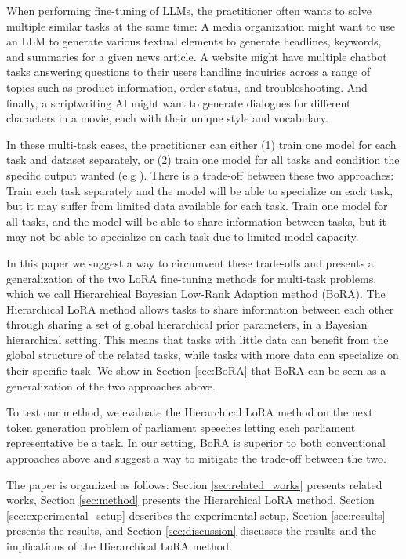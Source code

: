 \documentclass[fullpaper]{nldl}
\begin{document}
When performing fine-tuning of LLMs, the practitioner often wants to solve multiple similar tasks at the same time: 
A media organization might want to use an LLM to generate various textual elements to generate headlines, keywords, and summaries for a given news article. 
A website might have multiple chatbot tasks answering questions to their users handling inquiries across a range of topics such as product information, order status, and troubleshooting.
And finally, a scriptwriting AI might want to generate dialogues for different characters in a movie, each with their unique style and vocabulary.

In these multi-task cases, the practitioner can either (1) train one model for each task and dataset separately, or (2) train one model for all tasks and condition the specific output wanted (e.g \cite{Raffel2019}).
There is a trade-off between these two approaches: Train each task separately and the model will be able to specialize on each task, but it may suffer from limited data available for each task. Train one model for all tasks, and the model will be able to share information between tasks, but it may not be able to specialize on each task due to limited model capacity.

In this paper we suggest a way to circumvent these trade-offs and presents a generalization of the two LoRA fine-tuning methods for multi-task problems, which we call Hierarchical Bayesian Low-Rank Adaption method (BoRA).
The Hierarchical LoRA method allows tasks to share information between each other through sharing a set of global hierarchical prior parameters, in a Bayesian hierarchical setting. 
This means that tasks with little data can benefit from the global structure of the related tasks, while tasks with more data can specialize on their specific task.
We show in Section \ref{sec:BoRA} that BoRA can be seen as a generalization of the two approaches above.

To test our method, we evaluate the Hierarchical LoRA method on the next token generation problem of parliament speeches letting each parliament representative be a task. In our setting, BoRA is superior to both conventional approaches above and suggest a way to mitigate the trade-off between the two.

The paper is organized as follows: Section \ref{sec:related_works} presents related works, Section \ref{sec:method} presents the Hierarchical LoRA method, Section \ref{sec:experimental_setup} describes the experimental setup, Section \ref{sec:results} presents the results, and Section \ref{sec:discussion} discusses the results and the implications of the Hierarchical LoRA method.
\end{document}
